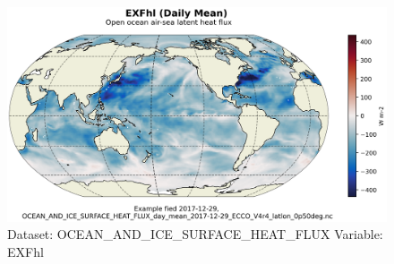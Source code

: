 \begin{figure}[H]
\centering
\includegraphics[scale=0.55]{../images/plots/latlon_plots/Ocean_and_Sea-Ice_Surface_Heat_Fluxes/EXFhl.png}
\caption{Dataset: OCEAN\_AND\_ICE\_SURFACE\_HEAT\_FLUX Variable: EXFhl}
\label{tab:table-OCEAN_AND_ICE_SURFACE_HEAT_FLUX_EXFhl-Plot}
\end{figure}
\pagebreak
